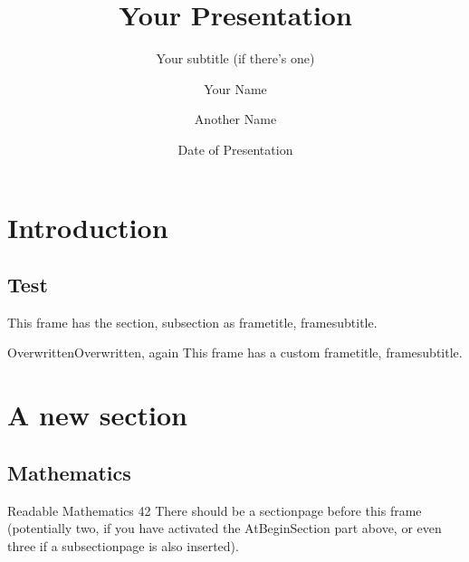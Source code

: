 \documentclass[
  10pt,
  aspectratio=169,
  xcolor={dvipsnames,table,x11names},  %
]{beamer}
\title[Your Short Title]{Your Presentation}
\subtitle{Your subtitle (if there's one)}
\author[\MakeUppercase{Your name (short)}]{Your Name \and Another Name}  %
\institute{Your Faculty/Department}
\date{Date of Presentation}
\begin{document}
{  %
\begin{frame}  %
  \titlepage
\end{frame}
}



\section{Introduction}
  \subsection{Test}

\begin{frame}
  This frame has the section, subsection as frametitle, framesubtitle.
\end{frame}



\begin{frame}{Overwritten}{Overwritten, again}
  This frame has a custom frametitle, framesubtitle.
\end{frame}



\section{A new section}
  \subsection{Mathematics}

\insertsectionpage

\begin{frame}{Readable Mathematics 42}
  There should be a sectionpage before this frame (potentially two, if you
  have activated the AtBeginSection part above, or even three if a
  subsectionpage is also inserted).
\end{frame}
\end{document}
